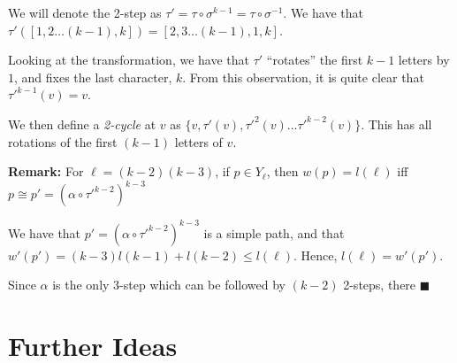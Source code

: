 \documentclass{article}
\newcommand{\edit}[1]{}%
\newcommand{\rough}[1]{}%
\begin{document}
{We will denote the 2-step as $\tau' = \tau \circ \sigma^{k-1} = \tau \circ \sigma^{-1}$.\edit{ does it make more sense to use $\tau'$ or a new letter; is the $\sigma^{-1}$ useful?} We have that $\tau'([1,2\dots (k-1),k]) = [2,3\dots (k-1),1,k]$.

\vspace{1.75em}

Looking at the transformation, we have that $\tau'$ ``rotates'' the first $k-1$ letters by $1$, and fixes the last character, $k$. From this observation, it is quite clear that $\tau'^{k-1}(v) = v$. 

We then define a \textit{2-cycle} at $v$ as $\{v, \tau'(v), \tau'^2(v) \dots \tau'^{k-2}(v)\}$. This has all rotations of the first $(k-1)$ letters of $v$.\edit{ prove/explain, reference Williams paper}

\rough{$l(k-2) = k-3, l_2(k-2) = k-2, l(k-1) = k-1$}\edit{ requires editing $w'$}


\rough{LEMMA SETUP}\textbf{Remark:} For $\ell = (k-2)(k-3)$, if $p \in Y_{\ell}$, then $w(p) = l(\ell)$ iff $p \cong p' = (\alpha \circ \tau'^{k-2})^{k-3}$\edit{ define $\alpha, \cong$, and writing a path like that}

\vspace{1.75em}

We have that $p' = (\alpha \circ \tau'^{k-2})^{k-3}$ is a simple path, and that $w'(p') = (k-3)l(k-1)+l(k-2) \leq l(\ell)$. Hence, $l(\ell) = w'(p')$.\edit{ show/explain the cycle}

\vspace{1.75em}

\rough{SHOW $p \ncong p' \in Y_\ell, w(p') > p$}

Since $\alpha$ is the only 3-step which can be followed by $(k-2)$ 2-steps, there
$\blacksquare$




\section{Further Ideas}

}
\end{document}
